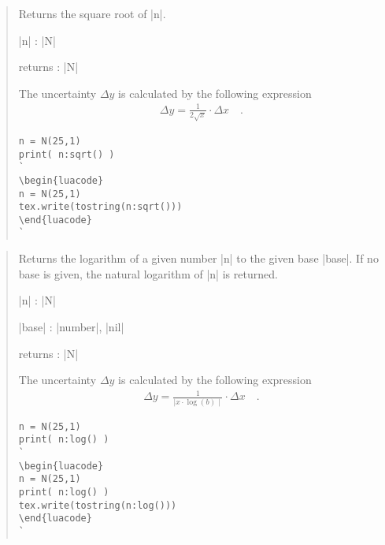 \documentclass{ltxdoc}
\begin{document}
\begin{quote}
  Returns the square root of |n|.

  \begin{description}
  \item |n| : |N|

  \item returns : |N|
  \end{description}

  The uncertainty $\Delta y$ is calculated by the following expression
  \begin{align*}
    \Delta y = \frac{1}{2 \sqrt{x}} \cdot \Delta x \quad.
  \end{align*}

\begin{lstlisting}
n = N(25,1)
print( n:sqrt() )
`
\begin{luacode}
n = N(25,1)
tex.write(tostring(n:sqrt()))
\end{luacode}
`
\end{lstlisting}

\end{quote}


\begin{quote}
   Returns the logarithm of a given number |n| to the given base |base|. If no base is given, the natural logarithm of |n| is returned.

  \begin{description}
  \item |n| : |N|

  \item |base| : |number|, |nil|

  \item returns : |N|
  \end{description}

  The uncertainty $\Delta y$ is calculated by the following expression
  \begin{align*}
    \Delta y = \frac{1}{\mid x \cdot \log(b) \mid} \cdot \Delta x \quad.
  \end{align*}

\begin{lstlisting}
n = N(25,1)
print( n:log() )
`
\begin{luacode}
n = N(25,1)
print( n:log() )
tex.write(tostring(n:log()))
\end{luacode}
`
\end{lstlisting}

\end{quote}
\end{document}
